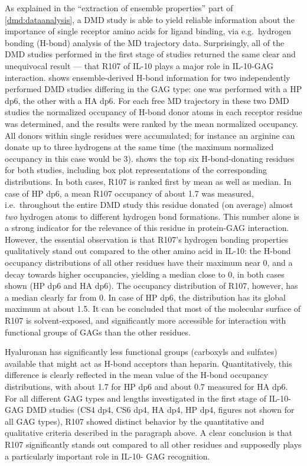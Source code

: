 As explained in the \enquote{extraction of ensemble properties} part of
\cref{dmd:dataanalysis}, a DMD study is able to yield reliable information
about the importance of single receptor amino acids for ligand binding, via
e.g.\ hydrogen bonding (H-bond) analysis of the MD trajectory data.
Surprisingly, all of the DMD studies performed in the first stage of studies
returned the same clear and unequivocal result --- that R107 of IL-10 plays a
major role in IL-10-GAG interaction. 
shows ensemble-derived H-bond information for two independently performed DMD
studies differing in the GAG type: one was performed with a HP dp6, the other
with a HA dp6. For each free MD trajectory in these two DMD studies the
normalized occupancy of H-bond donor atoms in each receptor residue was
determined, and the results were ranked by the mean normalized occupancy. All
donors within single residues were accumulated; for instance an arginine can
donate up to three hydrogens at the same time (the maximum normalized occupancy
in this case would be 3).  shows the
top six H-bond-donating residues for both studies, including box plot
representations of the corresponding distributions. In both cases, R107 is
ranked first by mean as well as median. In case of HP dp6, a mean R107 occupancy
of about 1.7 was measured, i.e.\ throughout the entire DMD study this residue
donated (on average) almost \textit{two} hydrogen atoms to different hydrogen
bond formations. This number alone is a strong indicator for the relevance of
this residue in protein-GAG interaction. However, the essential observation is
that R107's hydrogen bonding properties qualitatively stand out compared to the
other amino acid in IL-10: the H-bond occupancy distributions of all other
residues have their maximum near 0, and a decay towards higher occupancies,
yielding a median close to 0, in both cases shown (HP dp6 and HA dp6). The
occupancy distribution of R107, however, has a median clearly far from 0. In
case of HP dp6, the distribution has its global maximum at about 1.5. It can be
concluded that most of the molecular surface of R107 is solvent-exposed, and
significantly more accessible for interaction with functional groups of GAGs
than the other residues.

Hyaluronan has significantly less functional groups (carboxyls and sulfates)
available that might act as H-bond acceptors than heparin. Quantitatively, this
difference is clearly reflected in the mean value of the H-bond occupancy
distributions, with about 1.7 for HP dp6 and about 0.7 measured for HA dp6. For
all different GAG types and lengths investigated in the first stage of IL-10-GAG
DMD studies (CS4 dp4, CS6 dp4, HA dp4, HP dp4, figures not shown for all GAG
types), R107 showed distinct behavior by the quantitative and qualitative
criteria described in the paragraph above. A clear conclusion is that R107
significantly stands out compared to all other residues and supposedly plays a
particularly important role in IL-10- GAG recognition.

